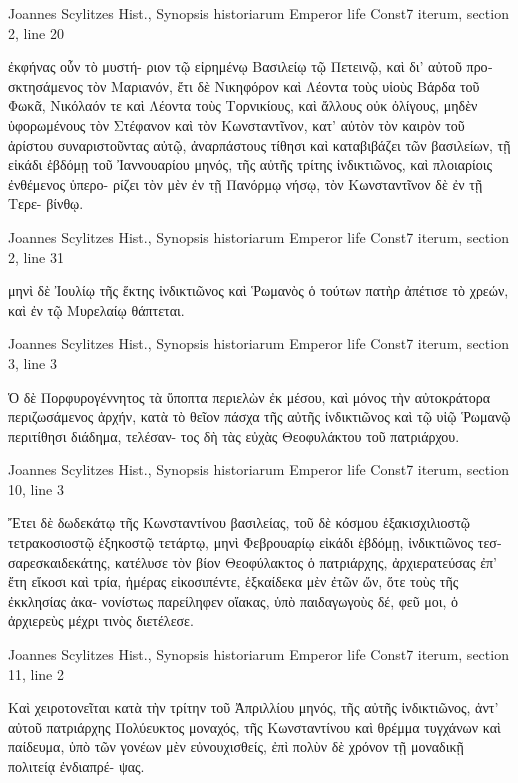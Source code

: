 \documentclass[12pt,letterpaper,twoside,final]{memoir}
\begin{document}
\begin{greek}
Joannes Scylitzes Hist., Synopsis historiarum 
Emperor life Const7 iterum, section 2, line 20

                                                        ἐκφήνας οὖν τὸ μυστή-
ριον τῷ εἰρημένῳ Βασιλείῳ τῷ Πετεινῷ, καὶ δι' αὐτοῦ προσκτησάμενος 
τὸν Μαριανόν, ἔτι δὲ Νικηφόρον καὶ Λέοντα τοὺς υἱοὺς Βάρδα τοῦ 
Φωκᾶ, Νικόλαόν τε καὶ Λέοντα τοὺς Τορνικίους, καὶ ἄλλους οὐκ ὀλίγους, 
μηδὲν ὑφορωμένους τὸν Στέφανον καὶ τὸν Κωνσταντῖνον, κατ' αὐτὸν 
τὸν καιρὸν τοῦ ἀρίστου συναριστοῦντας αὐτῷ, ἀναρπάστους τίθησι 
καὶ καταβιβάζει τῶν βασιλείων, τῇ εἰκάδι ἑβδόμῃ τοῦ Ἰαννουαρίου 
μηνός, τῆς αὐτῆς τρίτης ἰνδικτιῶνος, καὶ πλοιαρίοις ἐνθέμενος ὑπερο-
ρίζει τὸν μὲν ἐν τῇ Πανόρμῳ νήσῳ, τὸν Κωνσταντῖνον δὲ ἐν τῇ Τερε-
βίνθῳ. 



Joannes Scylitzes Hist., Synopsis historiarum 
Emperor life Const7 iterum, section 2, line 31

μηνὶ δὲ Ἰουλίῳ τῆς ἕκτης ἰνδικτιῶνος καὶ Ῥωμανὸς ὁ τούτων πατὴρ 
ἀπέτισε τὸ χρεών, καὶ ἐν τῷ Μυρελαίῳ θάπτεται. 



Joannes Scylitzes Hist., Synopsis historiarum 
Emperor life Const7 iterum, section 3, line 3

Ὁ δὲ Πορφυρογέννητος τὰ ὕποπτα περιελὼν ἐκ μέσου, καὶ 
μόνος τὴν αὐτοκράτορα περιζωσάμενος ἀρχήν, κατὰ τὸ θεῖον πάσχα 
τῆς αὐτῆς ἰνδικτιῶνος καὶ τῷ υἱῷ Ῥωμανῷ περιτίθησι διάδημα, τελέσαν-
τος δὴ τὰς εὐχὰς Θεοφυλάκτου τοῦ πατριάρχου. 



Joannes Scylitzes Hist., Synopsis historiarum 
Emperor life Const7 iterum, section 10, line 3

Ἔτει δὲ δωδεκάτῳ τῆς Κωνσταντίνου βασιλείας, τοῦ δὲ κόσμου 
ἑξακισχιλιοστῷ τετρακοσιοστῷ ἑξηκοστῷ τετάρτῳ, μηνὶ Φεβρουαρίῳ 
εἰκάδι ἑβδόμῃ, ἰνδικτιῶνος τεσσαρεσκαιδεκάτης, κατέλυσε τὸν βίον 
Θεοφύλακτος ὁ πατριάρχης, ἀρχιερατεύσας ἐπ' ἔτη εἴκοσι καὶ τρία, 
ἡμέρας εἰκοσιπέντε, ἑξκαίδεκα μὲν ἐτῶν ὤν, ὅτε τοὺς τῆς ἐκκλησίας ἀκα-
νονίστως παρείληφεν οἴακας, ὑπὸ παιδαγωγοὺς δέ, φεῦ μοι, ὁ ἀρχιερεὺς 
μέχρι τινὸς διετέλεσε. 



Joannes Scylitzes Hist., Synopsis historiarum 
Emperor life Const7 iterum, section 11, line 2

Καὶ χειροτονεῖται κατὰ τὴν τρίτην τοῦ Ἀπριλλίου μηνός, τῆς 
αὐτῆς ἰνδικτιῶνος, ἀντ' αὐτοῦ πατριάρχης Πολύευκτος μοναχός, τῆς 
Κωνσταντίνου καὶ θρέμμα τυγχάνων καὶ παίδευμα, ὑπὸ τῶν γονέων 
μὲν εὐνουχισθείς, ἐπὶ πολὺν δὲ χρόνον τῇ μοναδικῇ πολιτείᾳ ἐνδιαπρέ-
ψας. 




\end{greek}
\end{document}
